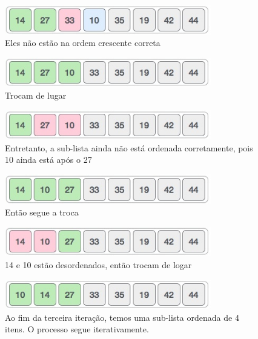 \begin{figure}[!htb]
\centering
\includegraphics[width=9cm]{img/insertion_sort_8.jpg}
\caption{Eles não estão na ordem crescente correta}
\label{fig:insertion8}
\end{figure}

\begin{figure}[!htb]
\centering
\includegraphics[width=9cm]{img/insertion_sort_9.jpg}
\caption{Trocam de lugar}
\label{fig:insertion9}
\end{figure}

\begin{figure}[!htb]
\centering
\includegraphics[width=9cm]{img/insertion_sort_10.jpg}
\caption{Entretanto, a sub-lista ainda não está ordenada corretamente, pois 10 ainda está após o 27}
\label{fig:insertion10}
\end{figure}

\begin{figure}[!htb]
\centering
\includegraphics[width=9cm]{img/insertion_sort_11.jpg}
\caption{Então segue a troca}
\label{fig:insertion11}
\end{figure}

\begin{figure}[!htb]
\centering
\includegraphics[width=9cm]{img/insertion_sort_12.jpg}
\caption{14 e 10 estão desordenados, então trocam de logar}
\label{fig:insertion12}
\end{figure}

\begin{figure}[!htb]
\centering
\includegraphics[width=9cm]{img/insertion_sort_13.jpg}
\caption{Ao fim da terceira iteração, temos uma sub-lista ordenada de 4 itens. O processo segue iterativamente.}
\label{fig:insertion13}
\end{figure}

